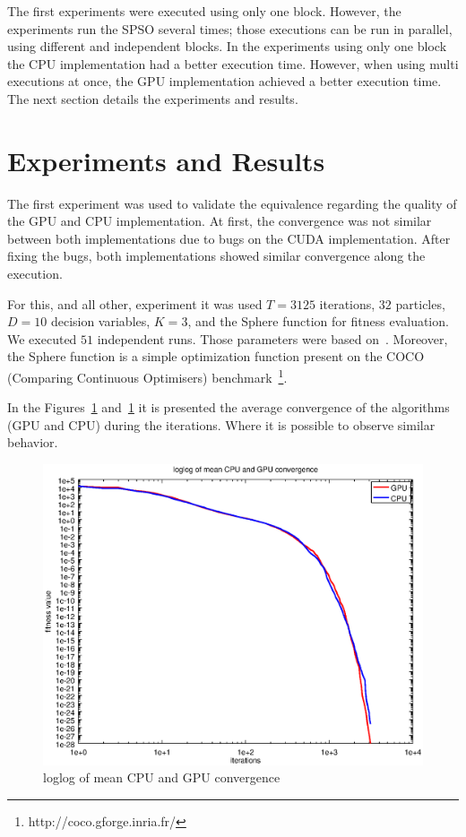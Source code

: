 \documentclass{article}
\begin{document}
    The first experiments were executed using only one block. However, the experiments run the SPSO several times; those executions can be run in parallel, using different and independent blocks. In the experiments using only one block the CPU implementation had a better execution time. However, when using multi executions at once, the GPU implementation achieved a better execution time.
    The next section details the experiments and results.

    \section{Experiments and Results}

    The first experiment was used to validate the equivalence regarding the quality of the GPU and CPU implementation. At first, the convergence was not similar between both implementations due to bugs on the CUDA implementation. After fixing the bugs, both implementations showed similar convergence along the execution.

    For this, and all other, experiment it was used $T=3125$ iterations, $32$ particles, $D=10$ decision variables, $K=3$, and the Sphere function for fitness evaluation.  We executed $51$ independent runs. Those parameters were based on~\cite{SPSOCEC}. Moreover, the Sphere function is a simple optimization function present on the COCO (Comparing Continuous Optimisers) benchmark~\footnote{http://coco.gforge.inria.fr/}.

    In the Figures~\ref{fig:loglog_convergence} and~\ref{fig:loglog_convergence} it is presented the average convergence of the algorithms (GPU and CPU) during the iterations. Where it is possible to observe similar behavior.

    \begin{figure}[!htb]
        \centering
        \includegraphics[width=.7\textwidth]{../img/loglog_convergence.eps}
        \caption{loglog of mean CPU and GPU convergence}
        \label{fig:loglog_convergence}
    \end{figure}
\end{document}
